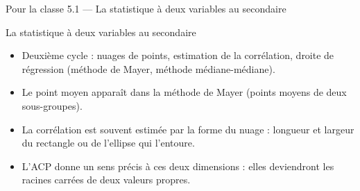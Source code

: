 \begin{frame}{Pour la classe 5.1 --- La statistique à deux variables au secondaire}
  \begin{Classe}{La statistique à deux variables au secondaire}
    \small
    \begin{itemize}
      \item Deuxième cycle : nuages de points, estimation de la corrélation,
        droite de régression (méthode de Mayer, méthode médiane-médiane).
      \item Le point moyen apparaît dans la méthode de Mayer (points moyens
        de deux sous-groupes).
      \item La corrélation est souvent estimée par la forme du nuage :
        longueur et largeur du rectangle ou de l'ellipse qui l'entoure.
      \item L'ACP donne un sens précis à ces deux dimensions : elles
        deviendront les racines carrées de deux valeurs propres.
    \end{itemize}
  \end{Classe}
\end{frame}
